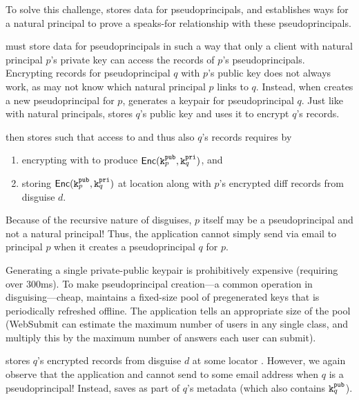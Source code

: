 %
To solve this challenge, \sys stores data for pseudoprincipals,
and establishes ways for a natural principal to prove a speaks-for
relationship with these pseudoprincipals.
%

%
\sys must store data for pseudoprincipals in such a way that only a client
with natural principal $p$'s private key can access the records of $p$'s
pseudoprincipals.
%
Encrypting records for pseudoprincipal $q$ with $p$'s public key does not
always work, as  \sys may not know which natural principal $p$ links to $q$.
%
Instead, when \sys creates a new pseudoprincipal for $p$, \sys generates
a keypair for pseudoprincipal $q$.
%
Just like with natural principals, \sys stores $q$'s public key and uses it
to encrypt $q$'s records.
%

\sys then stores  such that access to  and thus also $q$'s records requires
 by
\begin{enumerate}[nosep]
    \item encrypting  with  to produce $\mathsf{Enc}(\texttt{\ensuremath{\texttt{k}^{\text{pub}}_{p}}}, \texttt{\ensuremath{\texttt{k}^{\text{pri}}_{q}}})$, and
    \item storing $\mathsf{Enc}(\texttt{\ensuremath{\texttt{k}^{\text{pub}}_{p}}}, \texttt{\ensuremath{\texttt{k}^{\text{pri}}_{q}}})$ at location  along with $p$'s encrypted diff
records from disguise $d$.
\end{enumerate}

Because of the recursive nature of disguises, $p$ itself may be a pseudoprincipal and not a natural
principal! Thus, the application cannot simply send  via \eg email to principal $p$ when it
creates a pseudoprincipal $q$ for $p$.

Generating a single private-public keypair is prohibitively expensive (requiring over 300ms). To
make pseudoprincipal creation---a common operation in disguising---cheap, \sys maintains a
fixed-size pool of pregenerated keys that is periodically refreshed offline. The application tells
\sys an appropriate size of the pool (\eg WebSubmit can estimate the maximum number of users in any
single class, and multiply this by the maximum number of answers each user can submit).

\sys stores $q$'s encrypted records from disguise $d$ at some locator .  However, we again
observe that the application and \sys cannot send  to some email address when $q$ is a
pseudoprincipal! Instead, \sys saves  as part of $q$'s metadata (which also contains $\texttt{\ensuremath{\texttt{k}^{\text{pub}}_{q}}}$).

